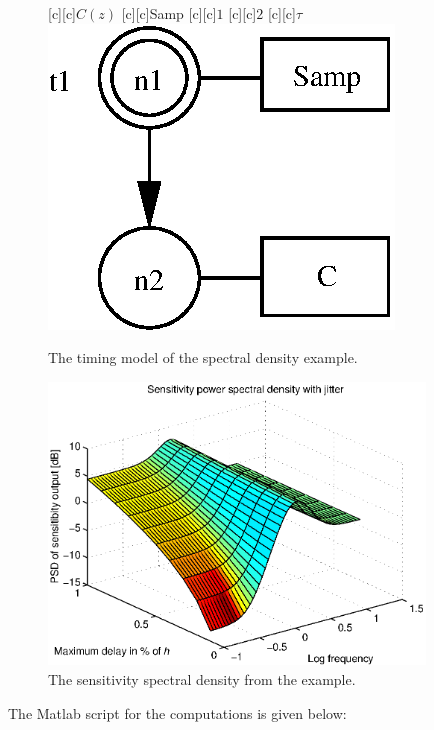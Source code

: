 \documentclass[final,twoside]{rapport}  %
\begin{document}
\begin{figure}
  \center
  [c][c]{$C(z)$}
  [c][c]{\small Samp}
  [c][c]{$1$}
  [c][c]{$2$}
  [c][c]{$\tau$}
  \includegraphics[scale=0.63]{timingspectdens.eps}
  \caption{The timing model of the spectral density example.}
  \label{fig:timingspectdens}
\end{figure}

\begin{figure}
  \center
  \includegraphics[width=10cm]{spectdens.eps}
  \caption{The sensitivity spectral density from the example.}
  \label{fig:spectdens}
\end{figure}

The Matlab script for the computations is given below:
\begin{small}

\end{small}
\end{document}
